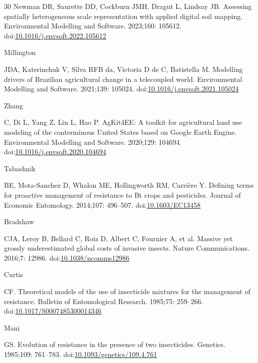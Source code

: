 \documentclass[10pt,letterpaper]{article}
\begin{document}
\begin{thebibliography}{30}
\hypertarget{ref-Newman2023}{Newman} DR, Saurette DD, Cockburn JMH, Dragut L, Lindsay JB. {Assessing spatially heterogeneous scale representation with applied digital soil mapping}. Environmental Modelling and Software. 2023;160: 105612. doi:\href{https://doi.org/10.1016/j.envsoft.2022.105612}{10.1016/j.envsoft.2022.105612}

\hypertarget{ref-Millington2021}{Millington} JDA, Katerinchuk V, Silva RFB da, Victoria D de C, Batistella M. {Modelling drivers of Brazilian agricultural change in a telecoupled world}. Environmental Modelling and Software. 2021;139: 105024. doi:\href{https://doi.org/10.1016/j.envsoft.2021.105024}{10.1016/j.envsoft.2021.105024}

\hypertarget{ref-Zhang2020}{Zhang} C, Di L, Yang Z, Lin L, Hao P. {AgKit4EE: A toolkit for agricultural land use modeling of the conterminous United States based on Google Earth Engine}. Environmental Modelling and Software. 2020;129: 104694. doi:\href{https://doi.org/10.1016/j.envsoft.2020.104694}{10.1016/j.envsoft.2020.104694}

\hypertarget{ref-Tabashnik2014}{Tabashnik} BE, Mota-Sanchez D, Whalon ME, Hollingworth RM, Carri\`{e}re Y. {Defining terms for proactive management of resistance to Bt crops and pesticides}. Journal of Economic Entomology. 2014;107: 496--507. doi:\href{https://doi.org/10.1603/EC13458}{10.1603/EC13458}

\hypertarget{ref-Bradshaw2016}{Bradshaw} CJA, Leroy B, Bellard C, Roiz D, Albert C, Fournier A, et al. {Massive yet grossly underestimated global costs of invasive insects}. Nature Communications. 2016;7: 12986. doi:\href{https://doi.org/10.1038/ncomms12986}{10.1038/ncomms12986}

\hypertarget{ref-Curtis1985}{Curtis} CF. {Theoretical models of the use of insecticide mixtures for the management of resistance}. Bulletin of Entomological Research. 1985;75: 259--266. doi:\href{https://doi.org/10.1017/S0007485300014346}{10.1017/S0007485300014346}

\hypertarget{ref-Mani1985}{Mani} GS. {Evolution of resistance in the presence of two insecticides.} Genetics. 1985;109: 761--783. doi:\href{https://doi.org/10.1093/genetics/109.4.761}{10.1093/genetics/109.4.761}

\end{thebibliography}
\end{document}
